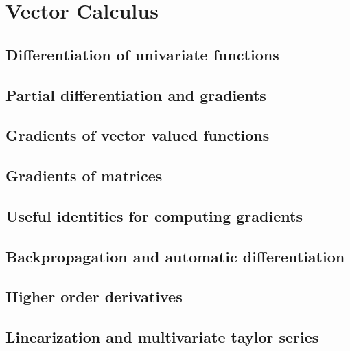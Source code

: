 \section{Vector Calculus}

\subsection{Differentiation of univariate functions}
\subsection{Partial differentiation and gradients}
\subsection{Gradients of vector valued functions}
\subsection{Gradients of matrices}
\subsection{Useful identities for computing gradients}
\subsection{Backpropagation and automatic differentiation}
\subsection{Higher order derivatives}
\subsection{Linearization and multivariate taylor series}
